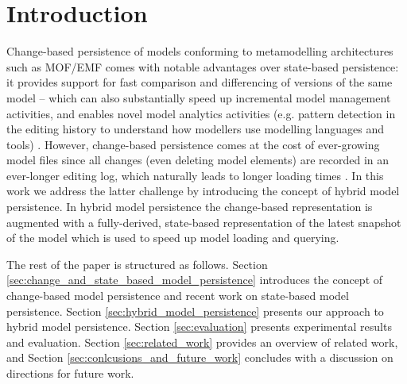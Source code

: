 \documentclass[10pt,conference]{IEEEtran}
\begin{document}
\section{Introduction}
\label{sec:introduction}
Change-based persistence of models conforming to metamodelling architectures such as MOF/EMF \cite{DBLP:conf/models/YohannisKP17} comes with notable advantages over state-based persistence: it provides support for fast comparison and differencing of versions of the same model \cite{DBLP:conf/sde/LippeO92,DBLP:conf/caise/IgnatN05,DBLP:conf/edoc/KoegelHLHD10,koegel2010emfstore}  -- which can also substantially speed up incremental model management activities, and enables novel model analytics activities (e.g. pattern detection in the editing history to understand how modellers use modelling languages and tools) \cite{DBLP:journals/entcs/RobbesL07}. However, change-based persistence comes at the cost of ever-growing model files \cite{DBLP:conf/edoc/KoegelHLHD10,DBLP:journals/entcs/RobbesL07} since all changes (even deleting model elements) are recorded in an ever-longer editing log, which naturally leads to longer loading times \cite{mens2002state}. In this work we address the latter challenge by introducing the concept of hybrid model persistence. In hybrid model persistence the change-based representation is augmented with a fully-derived, state-based representation of the latest snapshot of the model which is used to speed up model loading and querying.
 
The rest of the paper is structured as follows. Section \ref{sec:change_and_state_based_model_persistence} introduces the concept of change-based model persistence and recent work on state-based model persistence. Section \ref{sec:hybrid_model_persistence} presents our approach to hybrid model persistence. Section \ref{sec:evaluation} presents experimental results and evaluation. Section \ref{sec:related_work} provides an overview of related work, and Section \ref{sec:conlcusions_and_future_work} concludes with a discussion on directions for future work.
\end{document}
